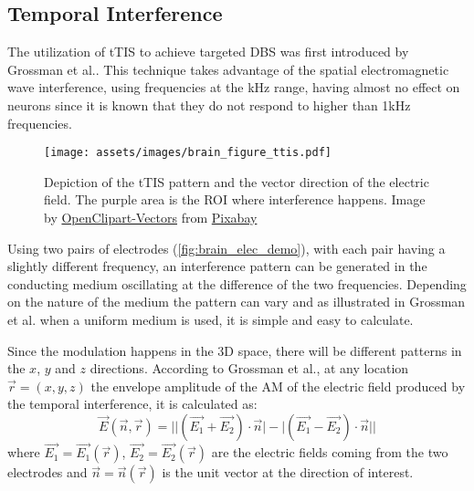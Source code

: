\pagebreak
\subsection{Temporal Interference}
The utilization of \gls{tTIS} to achieve targeted \gls{DBS} was first introduced by Grossman et al.\cite{Grossman2017}. This technique takes advantage of the spatial electromagnetic wave interference, using frequencies at the \si{kHz} range, having almost no effect on neurons since it is known that they do not respond to higher than 1\si{kHz}  frequencies.
\\\vspace{1pt}

\begin{wrapfigure}{r}{0.48\textwidth}
    \vspace{-10pt}
    \centering
    \texttt{[image: assets/images/brain\_figure\_ttis.pdf]}
    \caption[Depiction of the \gls{tTIS} pattern and the vector direction of the electric field. The purple area is the \gls{ROI} where interference happens.]{Depiction of the \gls{tTIS} pattern and the vector direction of the electric field. The purple area is the \gls{ROI} where interference happens. Image by \href{https://pixabay.com/users/openclipart-vectors-30363/?utm_source=link-attribution&amp;utm_medium=referral&amp;utm_campaign=image&amp;utm_content=150935}{OpenClipart-Vectors} from \href{https://pixabay.com/?utm_source=link-attribution&amp;utm_medium=referral&amp;utm_campaign=image&amp;utm_content=150935}{Pixabay}}
    \label{fig:brain_elec_demo}
\end{wrapfigure}

Using two pairs of electrodes (\autoref{fig:brain_elec_demo}), with each pair having a slightly different frequency, an interference pattern can be generated in the conducting medium oscillating at the difference of the two frequencies. Depending on the nature of the medium the pattern can vary and as illustrated in Grossman et al.\cite{Grossman2017} when a uniform medium is used, it is simple and easy to calculate.

Since the modulation happens in the 3D space, there will be different patterns in the $x$, $y$ and $z$ directions. According to Grossman et al.\cite[page 20]{Grossman2017}, at any location $\vec{r} = (x,y,z)$ the envelope amplitude of the \gls{AM} of the electric field produced by the temporal interference, it is calculated as:
\begin{equation}
    \label{eq:directional_amplitude}
    \vec{E}(\vec{n},\vec{r}) = \Big|\big|(\vec{E_1} + \vec{E_2})\cdot\vec{n}\big| - \big|(\vec{E_1} - \vec{E_2})\cdot\vec{n}\big|\Big|
\end{equation}
where $\vec{E_1} = \vec{E_1}(\vec{r})$, $\vec{E_2} = \vec{E_2}(\vec{r})$ are the electric fields coming from the two electrodes and $\vec{n} = \vec{n}(\vec{r})$ is the unit vector at the direction of interest.
\\\vspace{1pt}

